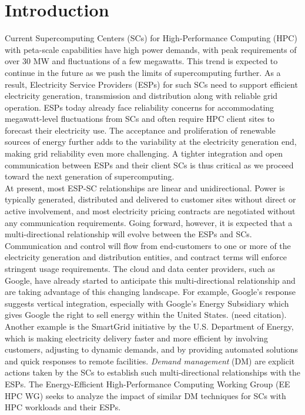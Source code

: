 \section{Introduction}

Current Supercomputing Centers (SCs) for High-Performance Computing (HPC) with peta-scale capabilities have high power demands, with peak requirements of over 30 MW and fluctuations of a few megawatts. This trend is expected to continue in the future as we push the limits of supercomputing further. As a result, Electricity Service Providers (ESPs) for such SCs need to support efficient electricity generation, transmission and distribution along with reliable grid operation. ESPs today already face reliability concerns for accommodating megawatt-level fluctuations from SCs and often require HPC client sites to forecast their electricity use. The acceptance and proliferation of renewable sources of energy further adds to the variability at the electricity generation end, making grid reliability even more challenging. A tighter integration and open communication between ESPs and their client SCs is thus critical as we proceed toward the next generation of supercomputing. \\

At present, most ESP-SC relationships are linear and unidirectional. Power is typically generated, distributed and delivered to customer sites without direct or active involvement, and most electricity pricing contracts are negotiated without any communication requirements. Going forward, however, it is expected that a multi-directional relationship will evolve between the ESPs and SCs.  Communication and control will flow from end-customers to one or more of the electricity generation and distribution entities, and contract terms will enforce stringent usage requirements. The cloud and data center providers, such as Google, have already started to anticipate this multi-directional relationship and are taking advantage of this changing landscape.  For example, Google's response suggests vertical integration, especially with Google's Energy Subsidiary which gives Google the right to sell energy within the United States. (need citation). Another example is the SmartGrid initiative \cite{SmartGrid} by the U.S. Department of Energy, which is making electricity delivery faster and more efficient by involving customers, adjusting to dynamic demands, and by providing automated solutions and quick responses to remote facilities. \emph{Demand management} (DM) are explicit actions taken by the SCs to establish such multi-directional relationships with the ESPs. The Energy-Efficient High-Performance Computing Working Group (EE HPC WG) seeks to analyze the impact of similar DM techniques for SCs with HPC workloads and their ESPs. \\


